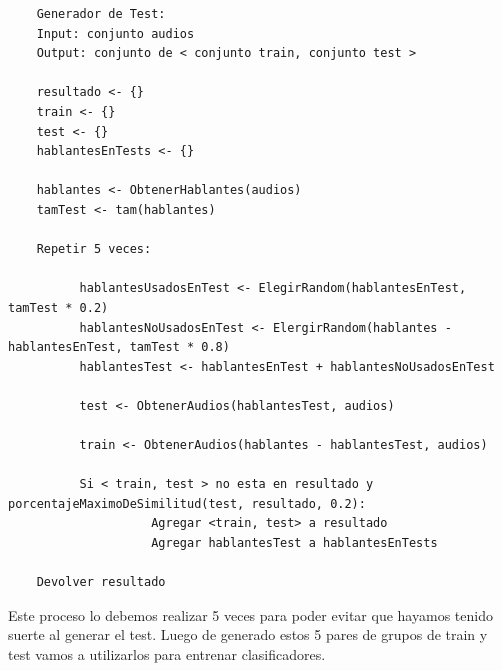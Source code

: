 \documentclass[11pt,a4paper,twoside]{tesis}
\begin{document}
\begin{lstlisting}
    Generador de Test:
    Input: conjunto audios
    Output: conjunto de < conjunto train, conjunto test >

    resultado <- {} 
    train <- {}
    test <- {}
    hablantesEnTests <- {}

    hablantes <- ObtenerHablantes(audios)
    tamTest <- tam(hablantes)

    Repetir 5 veces:

    	  hablantesUsadosEnTest <- ElegirRandom(hablantesEnTest, tamTest * 0.2)
    	  hablantesNoUsadosEnTest <- ElergirRandom(hablantes - hablantesEnTest, tamTest * 0.8)
    	  hablantesTest <- hablantesEnTest + hablantesNoUsadosEnTest

    	  test <- ObtenerAudios(hablantesTest, audios)

    	  train <- ObtenerAudios(hablantes - hablantesTest, audios)

    	  Si < train, test > no esta en resultado y porcentajeMaximoDeSimilitud(test, resultado, 0.2):
    	  			Agregar <train, test> a resultado
    	  			Agregar hablantesTest a hablantesEnTests

    Devolver resultado
\end{lstlisting}

Este proceso lo debemos realizar 5 veces para poder evitar que hayamos tenido suerte al generar el test. Luego de generado estos 5 pares de grupos de train y test vamos a utilizarlos para entrenar clasificadores.
\end{document}
